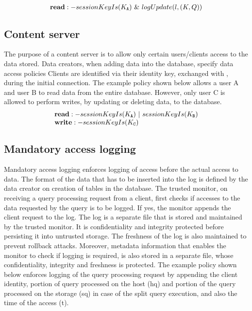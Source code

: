 \begin{enumerate}[wide=0pt]
\vspace{-3mm}
\[
 \begin{array}{@{}l@{}}
 \textbf{read}:-sessionKeyIs(K_{\tt A})~\&~logUpdate(l, (K, Q))
 \end{array}
\]
\vspace{-4mm}

\end{enumerate}


\subsection{Content server}

The purpose of a content server is to allow only certain users/clients access to the data stored. Data creators, when adding data into the database, specify data access policies Clients are identified via their identity key, exchanged with \project{}, during the initial connection. The example policy shown below allows a user A and user B to read data from the entire database. However, only user C is allowed to perform writes, by updating or deleting data, to the database.
\[
 \begin{array}{@{}l@{}}
 \textbf{read}:-sessionKeyIs (K_{\tt A}) ~ | ~ sessionKeyIs (K_{\tt B})\\
 \textbf{write}:-sessionKeyIs (K_{\tt C})\\
 \end{array}
\]

\subsection{Mandatory access logging}
\label{sec:use-case-mal}

Mandatory access logging enforces logging of access before the actual access to data. The format of the data that has to be inserted into the log is defined by the data creator on creation of tables in the database. The trusted monitor, on receiving a query processing request from a client, first checks if accesses to the data requested by the query is to be logged. If yes, the monitor appends the client request to the log. The log is a separate file that is stored and maintained by the trusted monitor. It is confidentiality and integrity protected before persisting it into untrusted storage. The freshness of the log is also maintained to prevent rollback attacks. Moreover, metadata information that enables the monitor to check if logging is required, is also stored in a separate file, whose confidentiality, integrity and freshness is protected. The example policy shown below enforces logging of the query processing request by appending the client identity, portion of query processed on the host (hq) and portion of the query processed on the storage (sq) in case of the split query execution, and also the time of the access (t).

